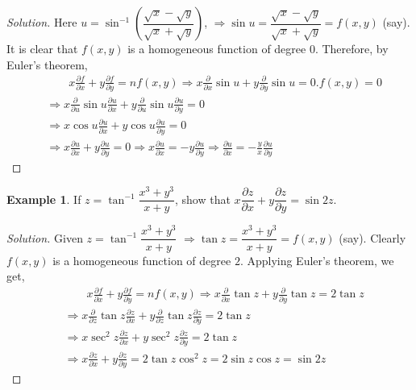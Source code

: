 \documentclass[../../main.tex]{subfiles}
\theoremstyle{definition}
\newtheorem{example}{Example}[section]
\newenvironment{solution}
    {\begin{proof}[Solution]}
    {\end{proof}}
\begin{document}
\begin{solution}
Here $u=\sin^{-1} (\dfrac{\sqrt{x}-\sqrt{y}}{\sqrt{x}+\sqrt{y}})$, $\Rightarrow \sin u=\dfrac{\sqrt{x}-\sqrt{y}}{\sqrt{x}+\sqrt{y}}=f(x,y)$ (say). It is clear that $f(x,y)$ is a homogeneous function of degree $0$. Therefore, by Euler's theorem, 
\begin{align*}
    &\qquad  x\frac{\partial f}{\partial x}+y\frac{\partial f}{\partial y}=nf(x,y)
    \Rightarrow x\frac{\partial }{\partial x}\sin u+y\frac{\partial }{\partial y}\sin u=0.f(x,y)=0 \\
    &\Rightarrow x\frac{\partial }{\partial u}\sin u\frac{\partial u}{\partial x}+y\frac{\partial }{\partial u}\sin u\frac{\partial u}{\partial y}=0 \\
    &\Rightarrow x \cos u\frac{\partial u}{\partial x}+y \cos u\frac{\partial u}{\partial y}=0 \\ 
    &\Rightarrow x\frac{\partial u}{\partial x}+y\frac{\partial u}{\partial y}=0 \Rightarrow x\frac{\partial u}{\partial x}=-y\frac{\partial u}{\partial y} \Rightarrow \frac{\partial u}{\partial x}=-\frac{y}{x} \frac{\partial u}{\partial y}
\end{align*}
\end{solution}

\begin{example}
If $z=\tan^{-1} \dfrac{x^3+y^3}{x+y}$, show that $x\dfrac{\partial z}{\partial x}+y\dfrac{\partial z}{\partial y}=\sin 2z$.
\end{example}

\begin{solution}
Given $z=\tan^{-1} \dfrac{x^3+y^3}{x+y}$ $\Rightarrow \tan z= \dfrac{x^3+y^3}{x+y}=f(x,y)$ (say). Clearly $f(x,y)$ is a homogeneous function of degree $2$. Applying Euler's theorem, we get,
\begin{align*}
    &\qquad x\frac{\partial f}{\partial x}+y\frac{\partial f}{\partial y}=nf(x,y)
    \Rightarrow x\frac{\partial }{\partial x}\tan z+y\frac{\partial }{\partial y}\tan z=2\tan z \\
    &\Rightarrow x\frac{\partial }{\partial z}\tan z\frac{\partial z}{\partial x}+y\frac{\partial }{\partial z}\tan z\frac{\partial z}{\partial y}=2\tan z \\
    &\Rightarrow x\sec^2 z\frac{\partial z}{\partial x}+y\sec^2 z\frac{\partial z}{\partial y}=2\tan z \\
    &\Rightarrow x\frac{\partial z}{\partial x}+y\frac{\partial z}{\partial y}=2\tan z\cos^2 z=2\sin z \cos z=\sin 2z
\end{align*}
\end{solution}
\end{document}
